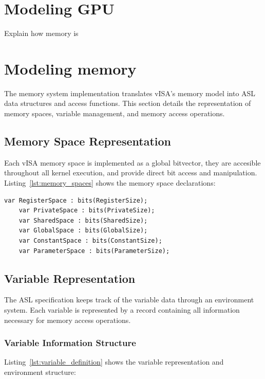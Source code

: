 \section{Modeling GPU}
Explain how memory is


\section{Modeling memory}
The memory system implementation translates vISA's memory model into ASL data
structures and access functions. This section details the representation of
memory spaces, variable management, and memory access operations.

\subsection{Memory Space Representation}
Each vISA memory space is implemented as a global bitvector, they are accesible
throughout all kernel execution, and provide direct bit access and
manipulation. Listing~\ref{lst:memory_spaces} shows the memory space
declarations:

\begin{lstlisting}[caption={Memory Space Declarations}, label={lst:memory_spaces}]
    var RegisterSpace : bits(RegisterSize);
    var PrivateSpace : bits(PrivateSize);
    var SharedSpace : bits(SharedSize);
    var GlobalSpace : bits(GlobalSize);
    var ConstantSpace : bits(ConstantSize);
    var ParameterSpace : bits(ParameterSize);
\end{lstlisting}

\subsection{Variable Representation}
\label{subsec:variable_representation}

The ASL specification keeps track of the variable data through an environment
system. Each variable is represented by a record containing all information
necessary for memory access operations.

\subsubsection{Variable Information Structure}
Listing~\ref{lst:variable_definition} shows the variable representation and
environment structure:

